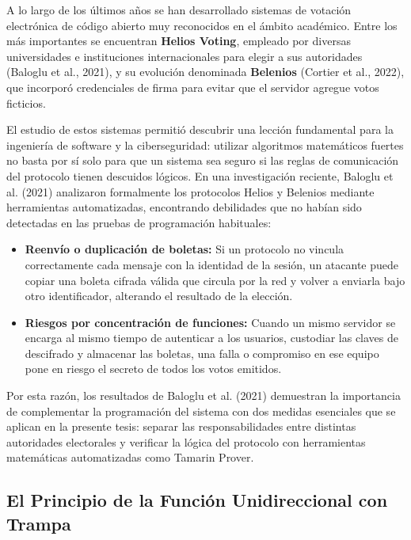 A lo largo de los últimos años se han desarrollado sistemas de votación electrónica de código abierto muy reconocidos en el ámbito académico. Entre los más importantes se encuentran \textbf{Helios Voting}, empleado por diversas universidades e instituciones internacionales para elegir a sus autoridades (Baloglu et al., 2021), y su evolución denominada \textbf{Belenios} (Cortier et al., 2022), que incorporó credenciales de firma para evitar que el servidor agregue votos ficticios.

El estudio de estos sistemas permitió descubrir una lección fundamental para la ingeniería de software y la ciberseguridad: utilizar algoritmos matemáticos fuertes no basta por sí solo para que un sistema sea seguro si las reglas de comunicación del protocolo tienen descuidos lógicos. En una investigación reciente, Baloglu et al. (2021) analizaron formalmente los protocolos Helios y Belenios mediante herramientas automatizadas, encontrando debilidades que no habían sido detectadas en las pruebas de programación habituales:

\begin{itemize}
	\item \textbf{Reenvío o duplicación de boletas:} Si un protocolo no vincula correctamente cada mensaje con la identidad de la sesión, un atacante puede copiar una boleta cifrada válida que circula por la red y volver a enviarla bajo otro identificador, alterando el resultado de la elección.

	\item \textbf{Riesgos por concentración de funciones:} Cuando un mismo servidor se encarga al mismo tiempo de autenticar a los usuarios, custodiar las claves de descifrado y almacenar las boletas, una falla o compromiso en ese equipo pone en riesgo el secreto de todos los votos emitidos.
\end{itemize}

Por esta razón, los resultados de Baloglu et al. (2021) demuestran la importancia de complementar la programación del sistema con dos medidas esenciales que se aplican en la presente tesis: separar las responsabilidades entre distintas autoridades electorales y verificar la lógica del protocolo con herramientas matemáticas automatizadas como Tamarin Prover.

\subsection{El Principio de la Función Unidireccional con Trampa}


